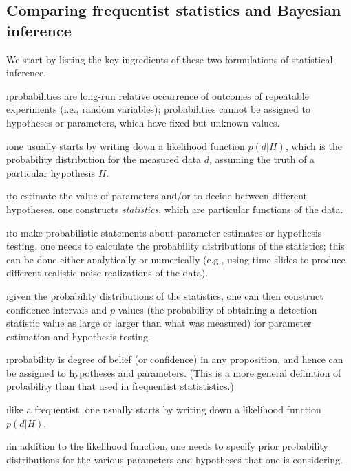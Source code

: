 \subsection{Comparing frequentist statistics and Bayesian inference}

We start by listing the key ingredients of these two formulations 
of statistical inference.
\medskip


\bi

\i probabilities are long-run relative occurrence of 
outcomes of repeatable experiments (i.e., random variables);
probabilities cannot be assigned to hypotheses or parameters, 
which have fixed but unknown values.

\i one usually starts by writing down a likelihood 
function $p(d|H)$, which is the probability distribution 
for the measured data $d$, assuming the truth of a particular
hypothesis $H$.

\i to estimate the value of parameters and/or to decide
between different hypotheses, one constructs 
{\em statistics}, which are particular functions of the data.

\i to make probabilistic statements about 
parameter estimates or hypothesis testing, 
one needs to calculate
the probability distributions of the statistics;
this can be done either analytically or numerically 
(e.g., using time slides to produce different realistic
noise realizations of the data).

\i given the probability distributions of the statistics,
one can then construct confidence intervals and 
$p$-values (the probability of obtaining a detection
statistic value as large or larger than what was measured) 
for parameter estimation and hypothesis testing.

\ei


\bi

\i probability is degree of belief (or confidence)
in any proposition, and hence can be assigned to 
hypotheses and parameters.
(This is a more general definition of probability than 
that used in frequentist statististics.)

\i like a frequentist, one usually starts by writing 
down a likelihood function $p(d|H)$.

\i in addition to the likelihood function, one needs to
specify prior probability distributions for the various 
parameters and hypotheses that one is considering.

